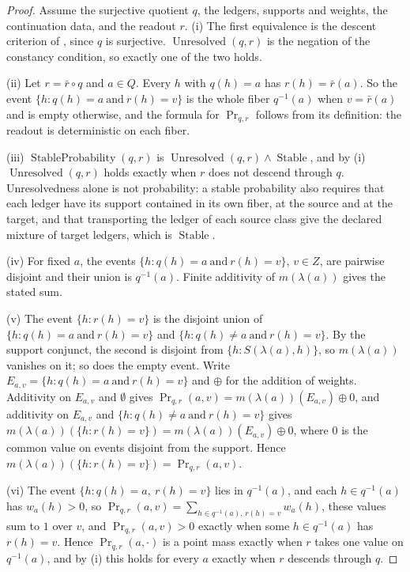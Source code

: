 \begin{proof}
Assume the surjective quotient \(q\), the ledgers, supports and
weights, the continuation data, and the readout \(r\).  (i) The first equivalence is the descent criterion of
, since \(q\) is surjective.
\(\operatorname{Unresolved}(q,r)\) is the negation of the constancy
condition, so exactly one of the two holds.

(ii) Let \(r=\bar r\circ q\) and \(a\in Q\).  Every \(h\) with \(q(h)=a\)
has \(r(h)=\bar r(a)\).  So the event \(\{h:q(h)=a\ \text{and}\ r(h)=v\}\)
is the whole fiber \(q^{-1}(a)\) when \(v=\bar r(a)\) and is empty
otherwise, and the formula for \(\operatorname{Pr}_{q,r}\) follows from its
definition: the readout is deterministic on each fiber.

(iii) \(\operatorname{StableProbability}(q,r)\) is
\(\operatorname{Unresolved}(q,r)\wedge\operatorname{Stable}\), and by (i)
\(\operatorname{Unresolved}(q,r)\) holds exactly when \(r\) does not descend
through \(q\).
Unresolvedness alone is not probability: a stable probability also requires
that each ledger have its support contained in its own fiber, at the source and at the
target, and that transporting the ledger of each source class give the
declared mixture of target ledgers, which is \(\operatorname{Stable}\).

(iv) For fixed \(a\), the events \(\{h:q(h)=a\ \text{and}\ r(h)=v\}\),
\(v\in Z\), are pairwise disjoint and their union is \(q^{-1}(a)\). Finite
additivity of \(m(\lambda(a))\) gives the stated sum.

(v) The event \(\{h:r(h)=v\}\) is the disjoint union of
\(\{h:q(h)=a\ \text{and}\ r(h)=v\}\) and \(\{h:q(h)\ne a\ \text{and}\ r(h)=v\}\).
By the support conjunct, the second is disjoint from
\(\{h:S(\lambda(a),h)\}\), so \(m(\lambda(a))\) vanishes on it; so does the
empty event. Write \(E_{a,v}=\{h:q(h)=a\ \text{and}\ r(h)=v\}\) and \(\oplus\)
for the addition of weights. Additivity on \(E_{a,v}\) and \(\emptyset\) gives
\(\operatorname{Pr}_{q,r}(a,v)=m(\lambda(a))(E_{a,v})\oplus 0\), and additivity
on \(E_{a,v}\) and \(\{h:q(h)\ne a\ \text{and}\ r(h)=v\}\) gives
\(m(\lambda(a))(\{h:r(h)=v\})=m(\lambda(a))(E_{a,v})\oplus 0\), where \(0\) is
the common value on events disjoint from the support. Hence
\(m(\lambda(a))(\{h:r(h)=v\})=\operatorname{Pr}_{q,r}(a,v)\).

(vi) The event \(\{h:q(h)=a,\ r(h)=v\}\) lies in \(q^{-1}(a)\), and each \(h\in
q^{-1}(a)\) has \(w_a(h)>0\), so \(\operatorname{Pr}_{q,r}(a,v)=\sum_{h\in q^{-1}(a),\,r(h)=v}w_a(h)\),
these values sum to \(1\) over \(v\), and \(\operatorname{Pr}_{q,r}(a,v)>0\)
exactly when some \(h\in q^{-1}(a)\) has \(r(h)=v\). Hence
\(\operatorname{Pr}_{q,r}(a,\cdot)\) is a point mass exactly when \(r\) takes
one value on \(q^{-1}(a)\), and by (i) this holds for every \(a\) exactly when
\(r\) descends through \(q\).
\end{proof}

